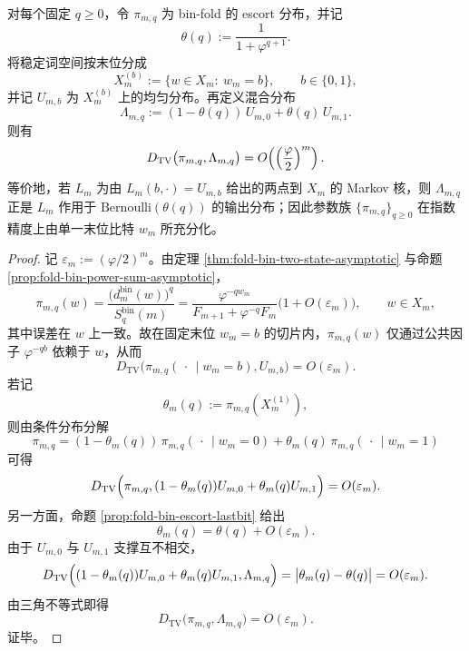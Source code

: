 \begin{conclusion}\label{con:xi-time-part9l-escort-single-bit-sufficiency}
对每个固定 \(q\ge 0\)，令 \(\pi_{m,q}\) 为 bin-fold 的 escort 分布，并记
\[
\theta(q):=\frac{1}{1+\varphi^{q+1}}.
\]
将稳定词空间按末位分成
\[
X_m^{(b)}:=\{w\in X_m:\ w_m=b\},
\qquad
b\in\{0,1\},
\]
并记 \(U_{m,b}\) 为 \(X_m^{(b)}\) 上的均匀分布。再定义混合分布
\[
\Lambda_{m,q}:=(1-\theta(q))\,U_{m,0}+\theta(q)\,U_{m,1}.
\]
则有
\[
D_{\mathrm{TV}}\bigl(\pi_{m,q},\Lambda_{m,q}\bigr)
=
O\!\left(\Bigl(\frac{\varphi}{2}\Bigr)^m\right).
\]
等价地，若 \(L_m\) 为由 \(L_m(b,\cdot)=U_{m,b}\) 给出的两点到 \(X_m\) 的 Markov 核，则 \(\Lambda_{m,q}\) 正是 \(L_m\) 作用于 \(\mathrm{Bernoulli}(\theta(q))\) 的输出分布；因此参数族 \(\{\pi_{m,q}\}_{q\ge 0}\) 在指数精度上由单一末位比特 \(w_m\) 所充分化。
\end{conclusion}
\begin{proof}
记 \(\varepsilon_m:=(\varphi/2)^m\)。由定理 \ref{thm:fold-bin-two-state-asymptotic} 与命题 \ref{prop:fold-bin-power-sum-asymptotic}，
\[
\pi_{m,q}(w)
=
\frac{\bigl(d_m^{\mathrm{bin}}(w)\bigr)^q}{S_q^{\mathrm{bin}}(m)}
=
\frac{\varphi^{-q w_m}}{F_{m+1}+\varphi^{-q}F_m}\bigl(1+O(\varepsilon_m)\bigr),
\qquad
w\in X_m,
\]
其中误差在 \(w\) 上一致。故在固定末位 \(w_m=b\) 的切片内，\(\pi_{m,q}(w)\) 仅通过公共因子 \(\varphi^{-qb}\) 依赖于 \(w\)，从而
\[
D_{\mathrm{TV}}\bigl(\pi_{m,q}(\,\cdot\,\mid w_m=b),U_{m,b}\bigr)=O(\varepsilon_m).
\]
若记
\[
\theta_m(q):=\pi_{m,q}(X_m^{(1)}),
\]
则由条件分布分解
\[
\pi_{m,q}
=(1-\theta_m(q))\,\pi_{m,q}(\,\cdot\,\mid w_m=0)+\theta_m(q)\,\pi_{m,q}(\,\cdot\,\mid w_m=1)
\]
可得
\[
D_{\mathrm{TV}}\Bigl(\pi_{m,q},(1-\theta_m(q))U_{m,0}+\theta_m(q)U_{m,1}\Bigr)
=
O(\varepsilon_m).
\]
另一方面，命题 \ref{prop:fold-bin-escort-lastbit} 给出
\[
\theta_m(q)=\theta(q)+O(\varepsilon_m).
\]
由于 \(U_{m,0}\) 与 \(U_{m,1}\) 支撑互不相交，
\[
D_{\mathrm{TV}}\Bigl((1-\theta_m(q))U_{m,0}+\theta_m(q)U_{m,1},\Lambda_{m,q}\Bigr)
=
\bigl|\theta_m(q)-\theta(q)\bigr|
=
O(\varepsilon_m).
\]
由三角不等式即得
\[
D_{\mathrm{TV}}\bigl(\pi_{m,q},\Lambda_{m,q}\bigr)=O(\varepsilon_m).
\]
证毕。
\end{proof}

